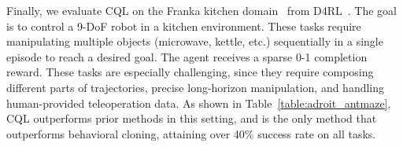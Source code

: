 Finally, we evaluate CQL on the Franka kitchen domain~\citep{gupta2019relay} from D4RL~\citep{d4rl_repo}.
The goal is to control a 9-DoF robot in a kitchen environment. These tasks require manipulating multiple objects (microwave, kettle, etc.) sequentially in a single episode to reach a desired goal. The agent receives a sparse 0-1 completion reward. These tasks are especially challenging, since they require composing different parts of trajectories, precise long-horizon manipulation, and handling human-provided teleoperation data. As shown in Table~\ref{table:adroit_antmaze}, CQL outperforms prior methods in this setting, and is the only method that outperforms behavioral cloning, attaining over 40\% success rate on all tasks.



\begin{table}[]
\centering

\fontsize{8}{8}\selectfont


\end{table}
